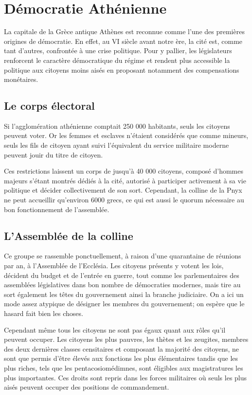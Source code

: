 \documentclass[11pt,a4paper]{report}
\begin{document}
\section{Démocratie Athénienne}
La capitale de la Grèce antique Athènes est reconnue comme l'une des premières origines de démocratie. 
En effet, au VI siècle avant notre ère, la cité est, comme tant d'autres, confrontée à une crise politique. 
Pour y pallier, les législateurs renforcent le caractère démocratique du régime et rendent plus accessible la politique aux citoyens moins aisés en proposant notamment des compensations monétaires.

\subsection{Le corps électoral}
Si l'agglomération athénienne comptait 250 000 habitants\nocite{persee:popu}, seuls les citoyens peuvent voter. 
Or les femmes et esclaves n'étaient considérés que comme mineurs, seuls les fils de citoyen ayant suivi l'équivalent du service militaire moderne peuvent jouir du titre de citoyen.

Ces restrictions laissent un corps de jusqu'à 40 000 citoyens, composé d'hommes majeurs s'étant montrés dédiés à la cité, autorisé à participer activement à sa vie politique et décider collectivement de son sort. 
Cependant, la colline de la Pnyx ne peut accueillir qu'environ 6000 grecs, ce qui est aussi le quorum nécessaire au bon fonctionnement de l'assemblée. \nocite{wiki:pnyx}

\subsection{L'Assemblée de la colline}
Ce groupe se rassemble ponctuellement, à raison d'une quarantaine de réunions par an, à l'Assemblée de l'Ecclésia. \nocite{wiki:ecclesia}
Les citoyens présents y votent les lois, décident du budget et de l'entrée en guerre, tout comme les parlementaires des assemblées législatives dans bon nombre de démocraties modernes, mais tire au sort également les têtes du gouvernement ainsi la branche judiciaire. \nocite{wiki:heliastes}
On a ici un mode assez atypique de désigner les membres du gouvernement; on espère que le hasard fait bien les choses.

Cependant même tous les citoyens ne sont pas égaux quant aux rôles qu'il peuvent occuper.
Les citoyens les plus pauvres, les thètes et les zeugites, membres des deux dernières classes censitaires et composant la majorité des citoyens, ne sont que permis d'être élevés aux fonctions les plus élémentaires\nocite{wiki:thetes} tandis que les plus riches, tels que les pentacosiomédimnes, sont éligibles aux magistratures les plus importantes.\nocite{wiki:penta}
Ces droits sont repris dans les forces militaires où seuls les plus aisés peuvent occuper des positions de commandement.\nocite{aristote:constitathenes}
\end{document}
